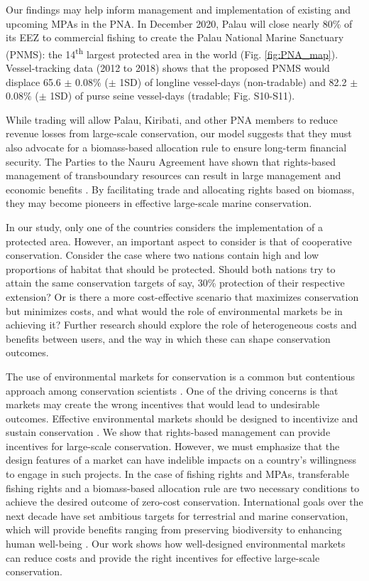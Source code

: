 \documentclass[12pt]{article}
\begin{document}
Our findings may help inform management and implementation of existing and upcoming MPAs in the PNA. In December 2020, Palau will close nearly 80\% of its EEZ to commercial fishing to create the Palau National Marine Sanctuary (PNMS): the 14\textsuperscript{th} largest protected area in the world (Fig. \ref{fig:PNA_map}). Vessel-tracking data (2012 to 2018) shows that the proposed PNMS would displace 65.6 $\pm$ 0.08\% ($\pm$ 1SD) of longline vessel-days (non-tradable) and 82.2 $\pm$ 0.08\% ($\pm$ 1SD) of purse seine vessel-days (tradable; Fig. S10-S11). 

While trading will allow Palau, Kiribati, and other PNA members to reduce revenue losses from large-scale conservation, our model suggests that they must also advocate for a biomass-based allocation rule to ensure long-term financial security. The Parties to the Nauru Agreement have shown that rights-based management of transboundary resources can result in large management and economic benefits \cite{havice_2013,aqorau_2018}. By facilitating trade and allocating rights based on biomass, they may become pioneers in effective large-scale marine conservation.

In our study, only one of the countries considers the implementation of a protected area. However, an important aspect to consider is that of cooperative conservation. Consider the case where two nations contain high and low proportions of habitat that should be protected. Should both nations try to attain the same conservation targets of say, 30\% protection of their respective extension? Or is there a more cost-effective scenario that maximizes conservation but minimizes costs, and what would the role of environmental markets be in achieving it? Further research should explore the role of heterogeneous costs and benefits between users, and the way in which these can shape conservation outcomes.

The use of environmental markets for conservation is a common but contentious approach among conservation scientists \cite{sandbrook_2019}. One of the driving concerns is that markets may create the wrong incentives that would lead to undesirable outcomes. Effective environmental markets should be designed to incentivize and sustain conservation \cite{adams_2014}. We show that rights-based management can provide incentives for large-scale conservation. However, we must emphasize that the design features of a market can have indelible impacts on a country's willingness to engage in such projects. In the case of fishing rights and MPAs, transferable fishing rights and a biomass-based allocation rule are two necessary conditions to achieve the desired outcome of zero-cost conservation. International goals over the next decade have set ambitious targets for terrestrial and marine conservation, which will provide benefits ranging from preserving biodiversity to enhancing human well-being \cite{oleary_2016,dinerstein_2019,roberts_2017,ban_2019}. Our work shows how well-designed environmental markets can reduce costs and provide the right incentives for effective large-scale conservation.
\end{document}
